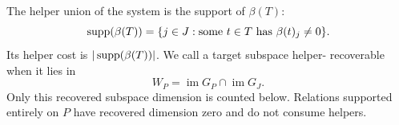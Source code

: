 The helper union of the system is the support of $\beta(T)$:
\[
 \operatorname{supp}(\beta(T))=
 \{j\in J:\text{some }t\in T\text{ has }\beta(t)_j\ne0\}.
\]
Its helper cost is $|\operatorname{supp}(\beta(T))|$.  We call a target subspace helper-
recoverable when it lies in
\[
 W_P=\operatorname{im}G_P\cap\operatorname{im}G_J.
\]
Only this recovered subspace dimension is counted below.  Relations supported
entirely on $P$ have recovered dimension zero and do not consume helpers.
